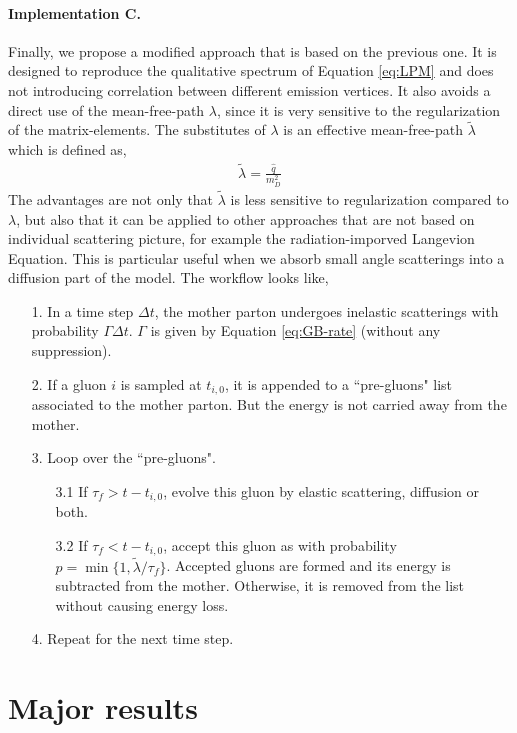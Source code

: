 \documentclass[aps, prc, reprint, amsmath, groupedaddress, nofootinbib]{revtex4-1}
\begin{document}
\paragraph*{Implementation C.} Finally, we propose a modified approach that is based on the previous one.
It is designed to reproduce the qualitative spectrum of Equation \ref{eq:LPM} and does not introducing correlation between different emission vertices. 
It also avoids a direct use of the mean-free-path $\lambda$, since it is very sensitive to the regularization of the matrix-elements. 
The substitutes of $\lambda$ is an effective mean-free-path $\tilde{\lambda}$ which is defined as,
\begin{eqnarray}
\tilde{\lambda} = \frac{\hat{q}}{m_D^2}
\end{eqnarray}
The advantages are not only that $\tilde{\lambda}$ is less sensitive to regularization compared to $\lambda$, but also that it can be applied to other approaches that are not based on individual scattering picture, for example the radiation-imporved Langevion Equation.
This is particular useful when we absorb small angle scatterings into a diffusion part of the model. The workflow looks like,
\begin{itemize}
\item[1.] In a time step $\Delta t$, the mother parton undergoes inelastic scatterings with probability $\Gamma\Delta t$. $\Gamma$ is given by Equation \ref{eq:GB-rate} (without any suppression).
\item[2.] If a gluon $i$ is sampled at $t_{i,0}$, it is appended to a ``pre-gluons" list associated to the mother parton. But the energy is not carried away from the mother.
\item[3.] Loop over the ``pre-gluons". 
\begin{itemize}
\item[3.1] If $\tau_f > t-t_{i,0}$, evolve this gluon by elastic scattering, diffusion or both.
\item[3.2] If $\tau_f < t-t_{i,0}$, accept this gluon as with probability $p = \min\{1, \tilde{\lambda}/\tau_f\}$. Accepted gluons are formed and its energy is subtracted from the mother. Otherwise, it is removed from the list without causing energy loss.
\end{itemize} 
\item[4.] Repeat for the next time step.
\end{itemize}

\section{Major results}
\end{document}
